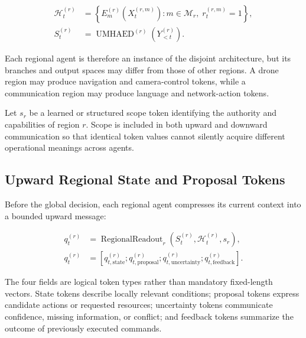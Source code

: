 \begin{equation}
\begin{aligned}
    \mathcal{H}_t^{(r)}
    &= \left\{
       E_m^{(r)}\!\left(X_t^{(r,m)}\right):
       m\in\mathcal{M}_r,\;r_t^{(r,m)}=1
       \right\},\\
    S_t^{(r)}
    &= \operatorname{UMHAED}^{(r)}\!\left(
       Y_{<t}^{(r)}
       \right).
\end{aligned}
\label{eq:regional_context}
\end{equation}

Each regional agent is therefore an instance of the disjoint architecture, but its branches and output spaces may differ from those of other regions. A drone region may produce navigation and camera-control tokens, while a communication region may produce language and network-action tokens.

Let $s_r$ be a learned or structured scope token identifying the authority and capabilities of region $r$. Scope is included in both upward and downward communication so that identical token values cannot silently acquire different operational meanings across agents.

\subsection{\textbf{Upward Regional State and Proposal Tokens}}

Before the global decision, each regional agent compresses its current context into a bounded upward message:

\begin{equation}
\begin{aligned}
    q_t^{(r)}
    &= \operatorname{RegionalReadout}_{r}\!\left(
       S_t^{(r)},\mathcal{H}_t^{(r)},s_r
       \right),\\
    q_t^{(r)}
    &= \left[
       q_{t,\mathrm{state}}^{(r)};
       q_{t,\mathrm{proposal}}^{(r)};
       q_{t,\mathrm{uncertainty}}^{(r)};
       q_{t,\mathrm{feedback}}^{(r)}
       \right].
\end{aligned}
\label{eq:regional_upward_message}
\end{equation}

The four fields are logical token types rather than mandatory fixed-length vectors. State tokens describe locally relevant conditions; proposal tokens express candidate actions or requested resources; uncertainty tokens communicate confidence, missing information, or conflict; and feedback tokens summarize the outcome of previously executed commands.

